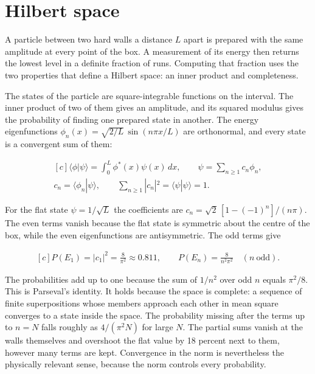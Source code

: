 \documentclass[11pt,oneside]{book}
\newenvironment{centeredalign}{\[\begin{gathered}[c]}{\end{gathered}\]}
\begin{document}
\clearpage

\section{Hilbert space}

\label{topic:hilbert-space}

A particle between two hard walls a distance \(L\) apart is prepared with the same amplitude at every point of the box. A measurement of its energy then returns the lowest level in a definite fraction of runs. Computing that fraction uses the two properties that define a Hilbert space: an inner product and completeness.

The states of the particle are square-integrable functions on the interval. The inner product of two of them gives an amplitude, and its squared modulus gives the probability of finding one prepared state in another. The energy eigenfunctions \(\phi_n(x)=\sqrt{2/L}\,\sin(n\pi x/L)\) are orthonormal, and every state is a convergent sum of them:

\begin{centeredalign}
\langle\phi|\psi\rangle=\int_0^L\phi^*(x)\psi(x)\,dx,\qquad
\psi=\sum_{n\geq1}c_n\phi_n,\\
c_n=\langle\phi_n|\psi\rangle,\qquad
\sum_{n\geq1}|c_n|^2=\langle\psi|\psi\rangle=1.
\end{centeredalign}

For the flat state \(\psi=1/\sqrt L\) the coefficients are \(c_n=\sqrt2\,[1-(-1)^n]/(n\pi)\). The even terms vanish because the flat state is symmetric about the centre of the box, while the even eigenfunctions are antisymmetric. The odd terms give

\begin{centeredalign}
P(E_1)=|c_1|^2=\frac{8}{\pi^2}\approx0.811,\qquad
P(E_n)=\frac{8}{n^2\pi^2}\quad(n\ \text{odd}).
\end{centeredalign}

The probabilities add up to one because the sum of \(1/n^2\) over odd \(n\) equals \(\pi^2/8\). This is Parseval's identity. It holds because the space is complete: a sequence of finite superpositions whose members approach each other in mean square converges to a state inside the space. The probability missing after the terms up to \(n=N\) falls roughly as \(4/(\pi^2N)\) for large \(N\). The partial sums vanish at the walls themselves and overshoot the flat value by 18 percent next to them, however many terms are kept. Convergence in the norm is nevertheless the physically relevant sense, because the norm controls every probability.
\end{document}
